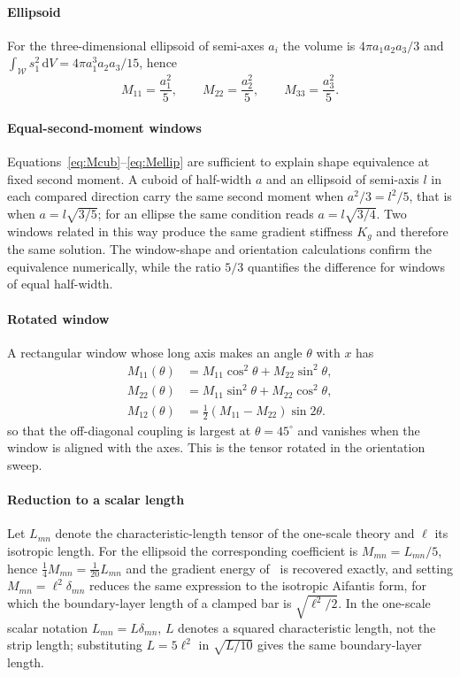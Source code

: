 \paragraph{Ellipsoid} For the three-dimensional ellipsoid of semi-axes $a_i$
the volume is $4\pi a_1a_2a_3/3$ and
$\int_{\mathcal W}s_1^{2}\,\mathrm{d}V = 4\pi a_1^{3}a_2a_3/15$, hence
\begin{equation}
  M_{11} = \frac{a_1^{2}}{5},\qquad
  M_{22}=\frac{a_2^{2}}{5},\qquad
  M_{33}=\frac{a_3^{2}}{5}.
  \label{eq:Mellip}
\end{equation}

\paragraph{Equal-second-moment windows} Equations~\eqref{eq:Mcub}--\eqref{eq:Mellip}
are sufficient to explain shape equivalence at fixed second moment. A cuboid of
half-width $a$ and an ellipsoid of semi-axis $l$ in each compared direction carry the same second moment
when $a^{2}/3=l^{2}/5$, that is when $a=l\sqrt{3/5}$; for an ellipse the same
condition reads $a=l\sqrt{3/4}$. Two windows related in this way produce the
same gradient stiffness $K_g$ and therefore the same solution. The
window-shape and orientation calculations confirm the equivalence numerically,
while the ratio $5/3$ quantifies the difference for windows of equal half-width.

\paragraph{Rotated window} A rectangular window whose long axis makes an angle
$\theta$ with $x$ has
\begin{equation}
  \begin{aligned}
  M_{11}(\theta) &= M_{11}\cos^{2}\theta + M_{22}\sin^{2}\theta,\\
  M_{22}(\theta) &= M_{11}\sin^{2}\theta + M_{22}\cos^{2}\theta,\\
  M_{12}(\theta) &= \tfrac12\left(M_{11}-M_{22}\right)\sin2\theta.
  \end{aligned}
  \label{eq:Mrot}
\end{equation}
so that the off-diagonal coupling is largest at $\theta=45^\circ$ and vanishes
when the window is aligned with the axes. This is the tensor rotated in the orientation sweep.

\paragraph{Reduction to a scalar length} Let $L_{mn}$ denote the characteristic-length tensor of the one-scale
theory and $\ell$ its isotropic length. For the ellipsoid the corresponding coefficient is
$M_{mn}=L_{mn}/5$, hence $\tfrac14M_{mn}=\tfrac1{20}L_{mn}$ and the gradient
energy of~\cite{fem1} is recovered exactly, and setting
$M_{mn}=\ell^{2}\delta_{mn}$ reduces the same expression to the isotropic
Aifantis form, for which the boundary-layer length of a clamped bar is
$\sqrt{\ell^{2}/2}$. In the one-scale scalar notation
$L_{mn}=L\delta_{mn}$, $L$ denotes a squared characteristic length, not
the strip length; substituting $L=5\ell^{2}$ in $\sqrt{L/10}$ gives the
same boundary-layer length.

\FloatBarrier
